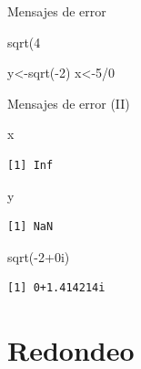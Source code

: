 \documentclass[
  ignorenonframetext,
  aspectratio=169,
  spanish,
]{beamer}
\newenvironment{Shaded}{\begin{snugshade}}{\end{snugshade}}
\newcommand{\DecValTok}[1]{\textcolor[rgb]{0.68,0.00,0.00}{#1}}
\newcommand{\FunctionTok}[1]{\textcolor[rgb]{0.28,0.35,0.67}{#1}}
\newcommand{\NormalTok}[1]{\textcolor[rgb]{0.00,0.23,0.31}{#1}}
\newcommand{\OtherTok}[1]{\textcolor[rgb]{0.00,0.23,0.31}{#1}}
\newcommand{\SpecialCharTok}[1]{\textcolor[rgb]{0.37,0.37,0.37}{#1}}
\begin{document}
\begin{frame}[fragile]{Mensajes de error}
\begin{Shaded}
\begin{Highlighting}[]
\FunctionTok{sqrt}\NormalTok{(}\DecValTok{4} 
\end{Highlighting}
\end{Shaded}

\begin{Shaded}
\begin{Highlighting}[]
\NormalTok{y}\OtherTok{\textless{}{-}}\FunctionTok{sqrt}\NormalTok{(}\SpecialCharTok{{-}}\DecValTok{2}\NormalTok{) }
\NormalTok{x}\OtherTok{\textless{}{-}}\DecValTok{5}\SpecialCharTok{/}\DecValTok{0}
\end{Highlighting}
\end{Shaded}
\end{frame}

\begin{frame}[fragile]{Mensajes de error (II)}
\label{mensajes-de-error-ii}
\begin{Shaded}
\begin{Highlighting}[]
\NormalTok{x}
\end{Highlighting}
\end{Shaded}

\begin{verbatim}
[1] Inf
\end{verbatim}

\begin{Shaded}
\begin{Highlighting}[]
\NormalTok{y}
\end{Highlighting}
\end{Shaded}

\begin{verbatim}
[1] NaN
\end{verbatim}

\begin{Shaded}
\begin{Highlighting}[]
\FunctionTok{sqrt}\NormalTok{(}\SpecialCharTok{{-}}\DecValTok{2}\SpecialCharTok{+}\DecValTok{0}\NormalTok{i)}
\end{Highlighting}
\end{Shaded}

\begin{verbatim}
[1] 0+1.414214i
\end{verbatim}
\end{frame}

\section{Redondeo}\label{redondeo}
\end{document}
